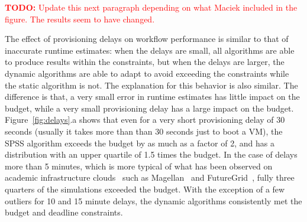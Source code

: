 \documentclass[conference]{IEEEtran}
\newcommand{\TODO}[1]{
  {\Large \textcolor{red}{\textbf{TODO: }#1}}
}
\begin{document}
\TODO{Update this next paragraph depending on what Maciek included in the figure. The results seem to have changed.}

The effect of provisioning delays on workflow performance is similar to that of inaccurate runtime estimates: when the delays are small, all algorithms are able to produce results within the constraints, but when the delays are larger, the dynamic algorithms are able to adapt to avoid exceeding the constraints while the static algorithm is not. The explanation for this behavior is also similar. The difference is that, a very small error in runtime estimates has little impact on the budget, while a very small provisioning delay has a large impact on the budget. Figure~\ref{fig:delays}.a shows that even for a very short provisioning delay of 30 seconds (usually it takes more than than 30 seconds just to boot a VM), the SPSS algorithm exceeds the budget by as much as a factor of 2, and has a distribution with an upper quartile of 1.5 times the budget. In the case of delays more than 5 minutes, which is more typical of what has been observed on academic infrastructure clouds~\cite{Juve2011} such as Magellan~\cite{Magellan} and FutureGrid~\cite{FutureGrid}, fully three quarters of the simulations exceeded the budget. With the exception of a few outliers for 10 and 15 minute delays, the dynamic algorithms consistently met the budget and deadline constraints.


\end{document}
